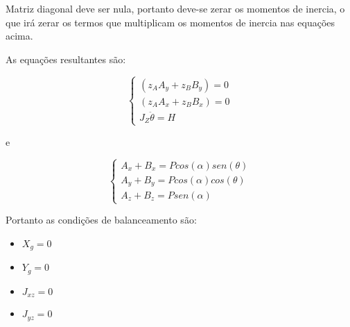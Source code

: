 \begin{namedtheorem}
Matriz diagonal deve ser nula, portanto deve-se zerar os momentos de inercia, o que irá zerar os termos que multiplicam os momentos de inercia nas equações acima.
\end{namedtheorem}

As equações resultantes são:

$$
\begin{cases}

(z_AA_y + z_BB_y) = 0\\
(z_AA_x + z_BB_x) = 0\\ 
J_Z\ddot{\theta} = H

\end{cases}$$

e

$$
\begin{cases}
A_x + B_x = Pcos(\alpha)sen(\theta)\\
A_y + B_y = Pcos(\alpha)cos(\theta)\\
A_z + B_z = Psen(\alpha)

\end{cases}
$$

\begin{namedtheorem}
Portanto as condições de balanceamento são:

\begin{itemize}
	\item $X_g = 0$
	\item $Y_g = 0$
	\item $J_{xz} = 0$
	\item $J_{yz} = 0$
\end{itemize}
\end{namedtheorem}











